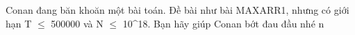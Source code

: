 Conan đang băn khoăn một bài toán. Đề bài như bài MAXARR1, nhưng có giới hạn T  $\le$  500000 và N  $\le$  10^18. Bạn hãy giúp Conan bớt đau đầu nhé ^^.